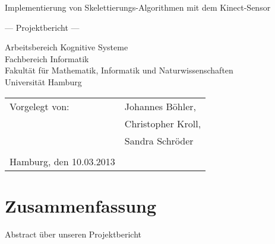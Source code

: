 \documentclass[
	12pt,
	a4paper,
	BCOR10mm,
	DIV14,
	listof=totoc,
	bibliography=totoc,
	headsepline
]{scrreprt}
\begin{document}
\begin{titlepage}
	\begin{center}
		{\titlefont\huge Implementierung von Skelettierungs-Algorithmen mit dem Kinect-Sensor\par}

		\bigskip
		\bigskip

		{\titlefont\Large --- Projektbericht ---\par}

		\bigskip
		\bigskip

		{\large Arbeitsbereich Kognitive Systeme\\
		Fachbereich Informatik\\
		Fakultät für Mathematik, Informatik und Naturwissenschaften\\
		Universität Hamburg\par}
	\end{center}
	
	\vfill
	
	{\large \begin{tabular}{ll}
		Vorgelegt von: & Johannes Böhler, \\
				& Christopher Kroll, \\ 
				& Sandra Schröder \\\\
		Hamburg, den 10.03.2013
	  \end{tabular}\par}

\end{titlepage}

\newcommand{\Autor}[1]{{\hfill \Large \textit{Autor: #1}}}

\chapter*{Zusammenfassung}

\thispagestyle{empty}

Abstract über unseren Projektbericht

\tableofcontents











\end{document}

